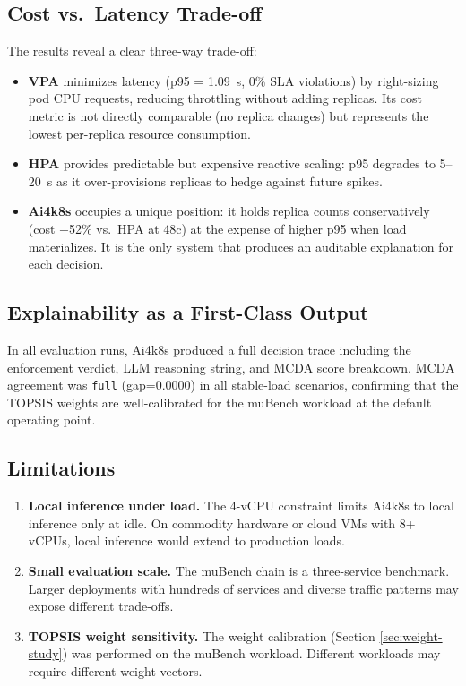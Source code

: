 \subsection{Cost vs.\ Latency Trade-off}
The results reveal a clear three-way trade-off:
\begin{itemize}
  \item \textbf{VPA} minimizes latency (p95 = 1.09~s, 0\% SLA violations) by
  right-sizing pod CPU requests, reducing throttling without adding replicas. Its
  cost metric is not directly comparable (no replica changes) but represents the
  lowest per-replica resource consumption.
  \item \textbf{HPA} provides predictable but expensive reactive scaling: p95
  degrades to 5--20~s as it over-provisions replicas to hedge against future
  spikes.
  \item \textbf{Ai4k8s} occupies a unique position: it holds replica counts
  conservatively (cost $-$52\% vs.\ HPA at 48c) at the expense of higher p95 when
  load materializes. It is the only system that produces an auditable explanation
  for each decision.
\end{itemize}

\subsection{Explainability as a First-Class Output}
In all evaluation runs, Ai4k8s produced a full decision trace including the
enforcement verdict, LLM reasoning string, and MCDA score breakdown. MCDA
agreement was \texttt{full} (gap=0.0000) in all stable-load scenarios, confirming
that the TOPSIS weights are well-calibrated for the muBench workload at the
default operating point.

\subsection{Limitations}
\begin{enumerate}
  \item \textbf{Local inference under load.} The 4-vCPU constraint limits
  Ai4k8s to local inference only at idle. On commodity hardware or cloud VMs
  with 8+ vCPUs, local inference would extend to production loads.
  \item \textbf{Small evaluation scale.} The muBench chain is a three-service
  benchmark. Larger deployments with hundreds of services and diverse traffic
  patterns may expose different trade-offs.
  \item \textbf{TOPSIS weight sensitivity.} The weight calibration (Section
  \ref{sec:weight-study}) was performed on the muBench workload. Different
  workloads may require different weight vectors.
\end{enumerate}
